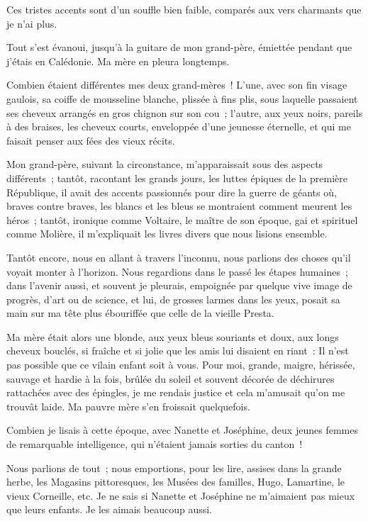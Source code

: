 \documentclass[french,twoside]{book} %
\begin{document}
\noindent Ces tristes accents sont d’un souffle bien faible, comparés aux vers charmants que je n’ai plus.\par
Tout s’est évanoui, jusqu’à la guitare de mon grand-père, émiettée pendant que j’étais en Calédonie. Ma mère en pleura longtemps.\par
Combien étaient différentes mes deux grand-mères ! L’une, avec son fin visage gaulois, sa coiffe de mousseline blanche, plissée à fins plis, sous laquelle passaient ses cheveux arrangés en gros chignon sur son cou ; l’autre, aux yeux noirs, pareils à des braises, les cheveux courts, enveloppée d’une jeunesse éternelle, et qui me faisait penser aux fées des vieux récits.\par
Mon grand-père, suivant la circonstance, m’apparaissait sous des aspects différents ; tantôt,  racontant les grands jours, les luttes épiques de la première République, il avait des accents passionnés pour dire la guerre de géants où, braves contre braves, les blancs et les bleus se montraient comment meurent les héros ; tantôt, ironique comme Voltaire, le maître de son époque, gai et spirituel comme Molière, il m’expliquait les livres divers que nous lisions ensemble.\par
Tantôt encore, nous en allant à travers l’inconnu, nous parlions des choses qu’il voyait monter à l’horizon. Nous regardions dans le passé les étapes humaines ; dans l’avenir aussi, et souvent je pleurais, empoignée par quelque vive image de progrès, d’art ou de science, et lui, de grosses larmes dans les yeux, posait sa main sur ma tête plus ébouriffée que celle de la vieille Presta.\par
Ma mère était alors une blonde, aux yeux bleus souriants et doux, aux longs cheveux bouclés, si fraîche et si jolie que les amis lui disaient en riant : Il n’est pas possible que ce vilain enfant soit à vous. Pour moi, grande, maigre, hérissée, sauvage et hardie à la fois, brûlée du soleil et souvent décorée de déchirures rattachées avec des épingles, je me rendais justice et cela m’amusait qu’on me trouvât laide. Ma pauvre mère s’en froissait quelquefois.\par
 Combien je lisais à cette époque, avec Nanette et Joséphine, deux jeunes femmes de remarquable intelligence, qui n’étaient jamais sorties du canton !\par
Nous parlions de tout ; nous emportions, pour les lire, assises dans la grande herbe, les Magasins pittoresques, les Musées des familles, Hugo, Lamartine, le vieux Corneille, etc. Je ne sais si Nanette et Joséphine ne m’aimaient pas mieux que leurs enfants. Je les aimais beaucoup aussi.\par
\end{document}
